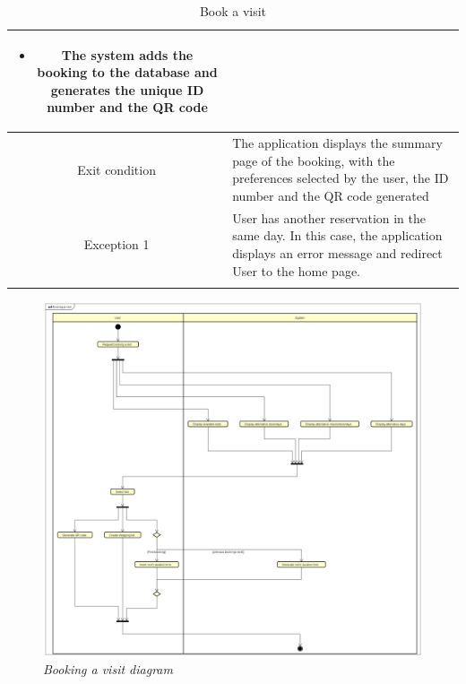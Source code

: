 \documentclass[table, 12pt]{article}
\begin{document}
\begin{longtable}{|c| p{10cm}|}
\begin{itemize}[nosep,after=\strut]
        \item The system adds the booking to the database and generates the unique ID number and the QR code
    \end{itemize}                                                                                                                   \\
    \hline
    Exit condition   & The application displays the summary page of the booking, with the preferences selected by the user, the ID number and the QR code generated
    \\
    \hline
    \hline
    Exception 1      & User has another reservation in the same day. In this case, the application displays an error message and redirect User to the home page.    \\
    \hline
    \caption{Book a visit}                                                                                                                                          \\
\end{longtable}




\begin{figure}[H]
    \centering
    \includegraphics[scale=0.26]{assets/Activity-Diagrams/act_booking.png}
    \caption{\textit{Booking a visit diagram}}
\end{figure}
\newpage
\end{document}
